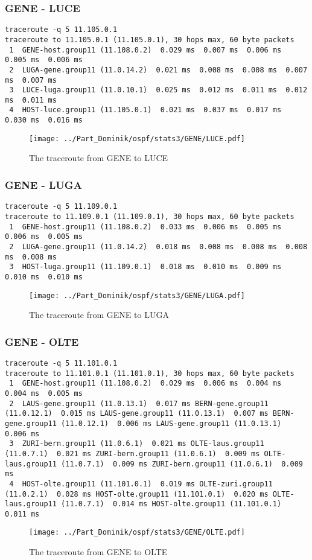 \subsubsection{GENE - LUCE}
\begin{lstlisting}
traceroute -q 5 11.105.0.1
traceroute to 11.105.0.1 (11.105.0.1), 30 hops max, 60 byte packets
 1  GENE-host.group11 (11.108.0.2)  0.029 ms  0.007 ms  0.006 ms  0.005 ms  0.006 ms
 2  LUGA-gene.group11 (11.0.14.2)  0.021 ms  0.008 ms  0.008 ms  0.007 ms  0.007 ms
 3  LUCE-luga.group11 (11.0.10.1)  0.025 ms  0.012 ms  0.011 ms  0.012 ms  0.011 ms
 4  HOST-luce.group11 (11.105.0.1)  0.021 ms  0.037 ms  0.017 ms  0.030 ms  0.016 ms
\end{lstlisting}
\begin{figure}[H]
\centering
\texttt{[image: ../Part\_Dominik/ospf/stats3/GENE/LUCE.pdf]}
\caption{The traceroute from GENE to LUCE}
\end{figure}
\clearpage
\subsubsection{GENE - LUGA}
\begin{lstlisting}
traceroute -q 5 11.109.0.1
traceroute to 11.109.0.1 (11.109.0.1), 30 hops max, 60 byte packets
 1  GENE-host.group11 (11.108.0.2)  0.033 ms  0.006 ms  0.005 ms  0.006 ms  0.005 ms
 2  LUGA-gene.group11 (11.0.14.2)  0.018 ms  0.008 ms  0.008 ms  0.008 ms  0.008 ms
 3  HOST-luga.group11 (11.109.0.1)  0.018 ms  0.010 ms  0.009 ms  0.010 ms  0.010 ms
\end{lstlisting}
\begin{figure}[H]
\centering
\texttt{[image: ../Part\_Dominik/ospf/stats3/GENE/LUGA.pdf]}
\caption{The traceroute from GENE to LUGA}
\end{figure}
\clearpage
\subsubsection{GENE - OLTE}
\begin{lstlisting}
traceroute -q 5 11.101.0.1
traceroute to 11.101.0.1 (11.101.0.1), 30 hops max, 60 byte packets
 1  GENE-host.group11 (11.108.0.2)  0.029 ms  0.006 ms  0.004 ms  0.004 ms  0.005 ms
 2  LAUS-gene.group11 (11.0.13.1)  0.017 ms BERN-gene.group11 (11.0.12.1)  0.015 ms LAUS-gene.group11 (11.0.13.1)  0.007 ms BERN-gene.group11 (11.0.12.1)  0.006 ms LAUS-gene.group11 (11.0.13.1)  0.006 ms
 3  ZURI-bern.group11 (11.0.6.1)  0.021 ms OLTE-laus.group11 (11.0.7.1)  0.021 ms ZURI-bern.group11 (11.0.6.1)  0.009 ms OLTE-laus.group11 (11.0.7.1)  0.009 ms ZURI-bern.group11 (11.0.6.1)  0.009 ms
 4  HOST-olte.group11 (11.101.0.1)  0.019 ms OLTE-zuri.group11 (11.0.2.1)  0.028 ms HOST-olte.group11 (11.101.0.1)  0.020 ms OLTE-laus.group11 (11.0.7.1)  0.014 ms HOST-olte.group11 (11.101.0.1)  0.011 ms
\end{lstlisting}
\begin{figure}[H]
\centering
\texttt{[image: ../Part\_Dominik/ospf/stats3/GENE/OLTE.pdf]}
\caption{The traceroute from GENE to OLTE}
\end{figure}
\clearpage
